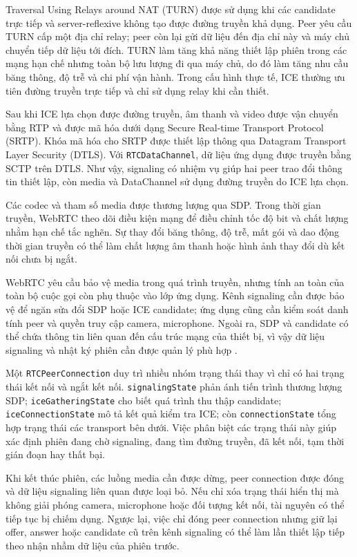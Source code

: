Traversal Using Relays around NAT (TURN) được sử dụng khi các candidate trực tiếp và server-reflexive không tạo được đường truyền khả dụng. Peer yêu cầu TURN cấp một địa chỉ relay; peer còn lại gửi dữ liệu đến địa chỉ này và máy chủ chuyển tiếp dữ liệu tới đích. TURN làm tăng khả năng thiết lập phiên trong các mạng hạn chế nhưng toàn bộ lưu lượng đi qua máy chủ, do đó làm tăng nhu cầu băng thông, độ trễ và chi phí vận hành. Trong cấu hình thực tế, ICE thường ưu tiên đường truyền trực tiếp và chỉ sử dụng relay khi cần thiết.

Sau khi ICE lựa chọn được đường truyền, âm thanh và video được vận chuyển bằng RTP và được mã hóa dưới dạng Secure Real-time Transport Protocol (SRTP). Khóa mã hóa cho SRTP được thiết lập thông qua Datagram Transport Layer Security (DTLS). Với \texttt{RTCDataChannel}, dữ liệu ứng dụng được truyền bằng SCTP trên DTLS. Như vậy, signaling có nhiệm vụ giúp hai peer trao đổi thông tin thiết lập, còn media và DataChannel sử dụng đường truyền do ICE lựa chọn.

Các codec và tham số media được thương lượng qua SDP. Trong thời gian truyền, WebRTC theo dõi điều kiện mạng để điều chỉnh tốc độ bit và chất lượng nhằm hạn chế tắc nghẽn. Sự thay đổi băng thông, độ trễ, mất gói và dao động thời gian truyền có thể làm chất lượng âm thanh hoặc hình ảnh thay đổi dù kết nối chưa bị ngắt.

WebRTC yêu cầu bảo vệ media trong quá trình truyền, nhưng tính an toàn của toàn bộ cuộc gọi còn phụ thuộc vào lớp ứng dụng. Kênh signaling cần được bảo vệ để ngăn sửa đổi SDP hoặc ICE candidate; ứng dụng cũng cần kiểm soát danh tính peer và quyền truy cập camera, microphone. Ngoài ra, SDP và candidate có thể chứa thông tin liên quan đến cấu trúc mạng của thiết bị, vì vậy dữ liệu signaling và nhật ký phiên cần được quản lý phù hợp .

Một \texttt{RTCPeerConnection} duy trì nhiều nhóm trạng thái thay vì chỉ có hai trạng thái kết nối và ngắt kết nối. \texttt{signalingState} phản ánh tiến trình thương lượng SDP; \texttt{iceGatheringState} cho biết quá trình thu thập candidate; \texttt{iceConnectionState} mô tả kết quả kiểm tra ICE; còn \texttt{connectionState} tổng hợp trạng thái các transport bên dưới. Việc phân biệt các trạng thái này giúp xác định phiên đang chờ signaling, đang tìm đường truyền, đã kết nối, tạm thời gián đoạn hay thất bại.

Khi kết thúc phiên, các luồng media cần được dừng, peer connection được đóng và dữ liệu signaling liên quan được loại bỏ. Nếu chỉ xóa trạng thái hiển thị mà không giải phóng camera, microphone hoặc đối tượng kết nối, tài nguyên có thể tiếp tục bị chiếm dụng. Ngược lại, việc chỉ đóng peer connection nhưng giữ lại offer, answer hoặc candidate cũ trên kênh signaling có thể làm lần thiết lập tiếp theo nhận nhầm dữ liệu của phiên trước.

